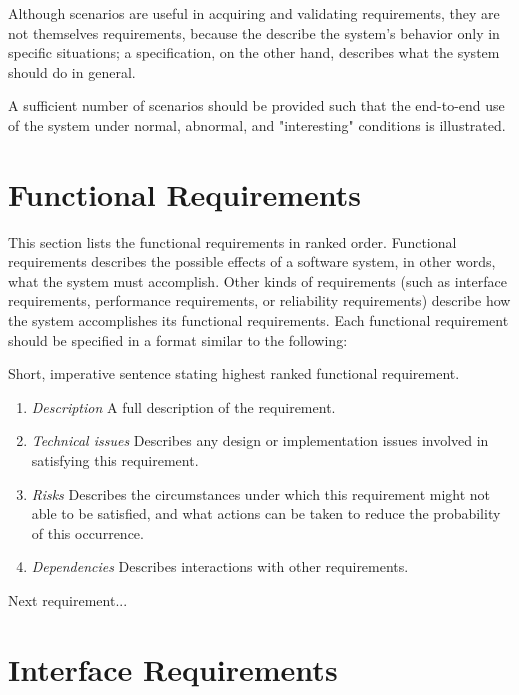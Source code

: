 Although scenarios are useful in acquiring and validating requirements,
they are not themselves requirements, because the describe the system's
behavior only in specific situations; a specification, on the other hand,
describes what the system should do in general.

A sufficient number of scenarios should be provided such that the
end-to-end use of the system under normal, abnormal, and "interesting"
conditions is illustrated.

\section{Functional Requirements}

This section lists the functional requirements in ranked order. Functional
requirements describes the possible effects of a software system, in other
words, what the system must accomplish. Other kinds of requirements (such
as interface requirements, performance requirements, or reliability
requirements) describe how the system accomplishes its functional
requirements. Each functional requirement should be specified in a format
similar to the following:

      Short, imperative sentence stating highest ranked functional requirement.

\begin{enumerate}
      
    \item{\em Description} A full description of the requirement.
      
    \item{\em Technical issues} Describes any design or implementation issues
      involved in satisfying this requirement.
      
    \item{\em Risks} Describes the circumstances under which this requirement
      might not able to be satisfied, and what actions can be taken to
      reduce the probability of this occurrence.
      
    \item{\em Dependencies} Describes interactions with other requirements.

\end{enumerate}

      Next requirement... 

\section{Interface Requirements}

